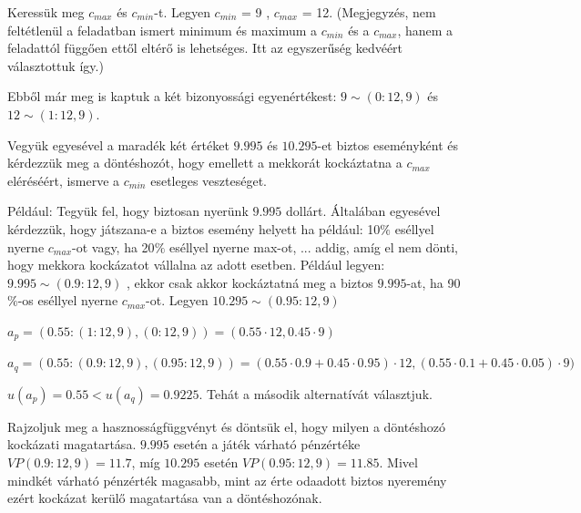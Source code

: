 \documentclass[a4paper,12pt]{article}
\begin{document}
Keressük meg $c_{max}$ és $c_{min}$-t. Legyen $c_{min}$ = 9 , $c_{max}$ = 12. (Megjegyzés, nem feltétlenül a feladatban ismert minimum és maximum a $c_{min}$ és a $c_{max}$, hanem a feladattól függően ettől eltérő is lehetséges. Itt az egyszerűség kedvéért választottuk így.)

Ebből már meg is kaptuk a két bizonyossági egyenértékest: $9 \sim (0: 12,9)$ és $12 \sim (1: 12,9)$.

Vegyük egyesével a maradék két értéket $9.995$ és $10.295$-et biztos eseményként és kérdezzük meg a döntéshozót, hogy emellett a mekkorát kockáztatna a $c_{max}$ eléréséért, ismerve a $c_{min}$ esetleges veszteséget.

Például: Tegyük fel, hogy biztosan nyerünk $9.995$ dollárt. Általában egyesével kérdezzük, hogy játszana-e a biztos esemény helyett ha például: 10$\%$ eséllyel nyerne $c_{max}$-ot vagy, ha 20$\%$ eséllyel nyerne max-ot, ... addig, amíg el nem dönti, hogy mekkora kockázatot vállalna az adott esetben. Például legyen: $9.995 \sim (0.9: 12,9)$ , ekkor csak akkor kockáztatná meg a biztos $9.995$-at, ha 90$\%$-os eséllyel nyerne $c_{max}$-ot. Legyen $10.295 \sim (0.95: 12,9)$ 

$a_p = (0.55:(1: 12,9),(0: 12,9)) = (0.55 \cdot 12, 0.45 \cdot 9)$

$a_q = (0.55:(0.9: 12,9),(0.95: 12,9)) = (0.55 \cdot 0.9 + 0.45 \cdot 0.95) \cdot 12, (0.55 \cdot 0.1 + 0.45 \cdot 0.05) \cdot 9)$

$u(a_p) = 0.55  < u(a_q) = 0.9225$. Tehát a második alternatívát választjuk.

Rajzoljuk meg a hasznosságfüggvényt és döntsük el, hogy milyen a döntéshozó kockázati magatartása. $9.995$ esetén a játék várható pénzértéke $VP(0.9: 12,9)=11.7$, míg $10.295$ esetén $VP(0.95: 12,9)=11.85$. Mivel mindkét várható pénzérték magasabb, mint az érte odaadott biztos nyeremény ezért kockázat kerülő magatartása van a döntéshozónak.


\end{document}
